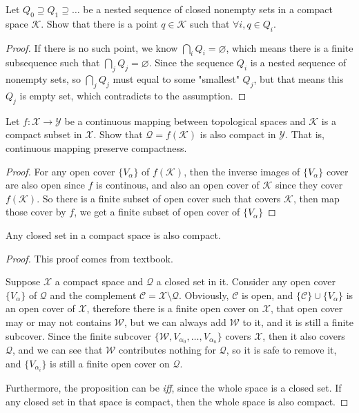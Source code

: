 \documentclass[./main.tex]{subfiles}
\begin{document}
\begin{theorem}
  Let $Q_0 \supseteq Q_1 \supseteq \dots$ be a nested sequence of closed
  nonempty sets in a compact space $\mathcal{K}$. Show that there is a point
  $q \in \mathcal{K}$ such that $\forall i, q \in Q_i$.
\end{theorem}
\begin{proof}
  If there is no such point, we know $\bigcap_i Q_i = \varnothing$,
  which means there is a finite subsequence such that $\bigcap_j Q_j = \varnothing$.
  Since the sequence $Q_i$ is a nested sequence of nonempty sets, so $\bigcap_j Q_j$
  must equal to some "smallest" $Q_j$, but that means this $Q_j$ is empty set,
  which contradicts to the assumption.
\end{proof}

\begin{theorem}
  Let $f : \mathcal{X} \rightarrow \mathcal{Y}$ be a continuous mapping
  between topological spaces and $\mathcal{K}$ is a compact subset in $\mathcal{X}$.
  Show that $\mathcal{Q} = f(\mathcal{K})$ is also compact in $\mathcal{Y}$.
  That is, continuous mapping preserve compactness.
\end{theorem}
\begin{proof}
  For any open cover $\{V_\alpha\}$ of $f(\mathcal{K})$, then the inverse images of 
  $\{V_\alpha\}$ cover
  are also open since $f$ is continous, and also an open cover of $\mathcal{K}$
  since they cover $f(\mathcal{K})$. So there is a finite subset of open cover
  such that covers $\mathcal{K}$, then map those cover by $f$, we get
  a finite subset of open cover of $\{V_\alpha\}$
\end{proof}

\begin{theorem}
  Any closed set in a compact space is also compact.
\end{theorem}
\begin{proof}
  This proof comes from textbook.\par
  Suppose $\mathcal{X}$ a compact space and $\mathcal{Q}$ a closed set in it.
  Consider any open cover $\{ V_\alpha \}$ of $\mathcal{Q}$ and
  the complement $\mathcal{C} = \mathcal{X} \setminus \mathcal{Q}$.
  Obviously, $\mathcal{C}$ is open, and $\{ \mathcal{C} \} \cup \{ V_\alpha \}$
  is an open cover of $\mathcal{X}$, therefore there is a finite open cover on
  $\mathcal{X}$, that open cover may or may not contains $\mathcal{W}$, but we 
  can always add $\mathcal{W}$ to it, and it is still a finite subcover.
  Since the finite subcover $\{ \mathcal{W}, V_{\alpha_0}, \dots, V_{\alpha_n} \}$
  covers $\mathcal{X}$, then it also covers $\mathcal{Q}$,
  and we can see that $\mathcal{W}$ contributes nothing for $\mathcal{Q}$,
  so it is safe to remove it, and $\{ V_{\alpha_i} \}$ is still a finite
  open cover on $\mathcal{Q}$.

  Furthermore, the proposition can be \textit{iff}, since
  the whole space is a closed set. If any closed set in that space is
  compact, then the whole space is also compact.
\end{proof}
\end{document}
